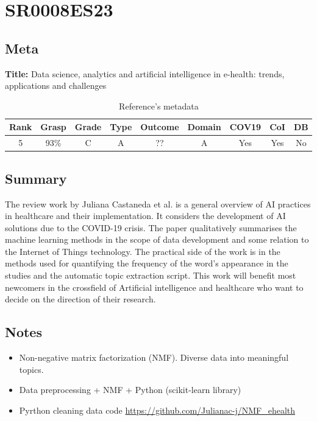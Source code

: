 \section{ SR0008ES23 }


\subsection{Meta}

    \textbf{Title:}
    Data science, analytics and artificial intelligence in e-health: trends, applications and challenges

    \begin{table}[H]
        \centering
        \begin{tabular}{|c|c|c|c|c|c|c|c|c|}
            \hline
                \textbf{Rank} & \textbf{Grasp} & \textbf{Grade} & \textbf{Type} & \textbf{Outcome} & \textbf{Domain} & \textbf{COV19} & \textbf{CoI} & \textbf{DB} \\
            \hline
                5 & 93\% & C & A & ?? & A & Yes & Yes & No \\
            \hline
        \end{tabular}
        \caption{Reference's metadata}
        \label{tab:SR0008ES23}
    \end{table}

\subsection{Summary}
    The review work by Juliana Castaneda et al. \cite{x249} is a general overview of AI practices in healthcare and their implementation. It considers the development of AI solutions due to the COVID-19 crisis. The paper qualitatively summarises the machine learning methods in the scope of data development and some relation to the Internet of Things technology. The practical side of the work is in the methods used for quantifying the frequency of the word's appearance in the studies and the automatic topic extraction script. This work will benefit most newcomers in the crossfield of Artificial intelligence and healthcare who want to decide on the direction of their research.

\subsection{Notes}
    \begin{itemize}
        \item Non-negative matrix factorization (NMF). Diverse data into meaningful topics.
        \item Data preprocessing + NMF + Python (scikit-learn library)
        \item Pyrthon cleaning data code \url{https://github.com/Julianac-j/NMF_ehealth}
    \end{itemize}


